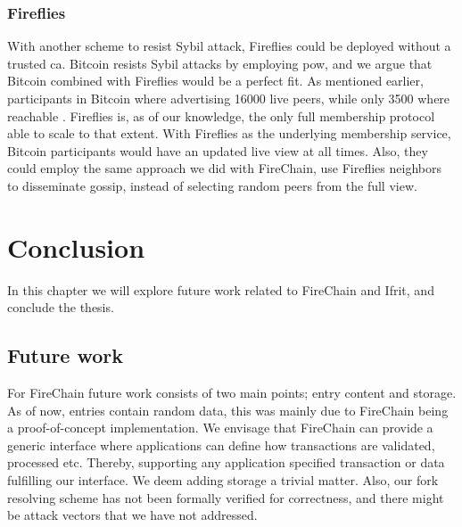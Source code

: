 \documentclass[USenglish]{uit-thesis}
\begin{document}
\subsection{Fireflies}

With another scheme to resist Sybil attack, Fireflies could be deployed without a trusted \gls{ca}.
Bitcoin resists Sybil attacks by employing \gls{pow}, and we argue that Bitcoin combined with Fireflies would be a perfect fit.
As mentioned earlier, participants in Bitcoin where advertising 16000 live peers, while only 3500 where reachable \cite{propa}.
Fireflies is, as of our knowledge, the only full membership protocol able to scale to that extent.
With Fireflies as the underlying membership service, Bitcoin participants would have an updated live view at all times.
Also, they could employ the same approach we did with FireChain, use Fireflies neighbors to disseminate gossip, instead of selecting random peers from the full view.


 



\fi

\chapter{Conclusion}\label{chap:conclusion}
In this chapter we will explore future work related to FireChain and Ifrit, and conclude the thesis.


\section{Future work}
For FireChain future work consists of two main points; entry content and storage.
As of now, entries contain random data, this was mainly due to FireChain being a proof-of-concept implementation.
We envisage that FireChain can provide a generic interface where applications can define how transactions are validated, processed etc.
Thereby, supporting any application specified transaction or data fulfilling our interface.
We deem adding storage a trivial matter.
Also, our fork resolving scheme has not been formally verified for correctness, and there might be attack vectors that we have not addressed.
\end{document}
